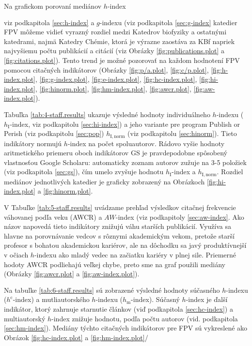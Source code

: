 Na grafickom porovaní mediánov $h$-index {viz podkapitola \ref{sec:h-index} a
$g$-indexu (viz podkapitola \ref{sec:g-index} katedier FPV môžeme vidieť vyrazný
rozdiel medzi Katedrov biofyziky a ostatnými katedrami, najmä Katedry Chémie,
ktorá je výrazne zaostáva za KBf napriek najvyšiemu počtu publikácií a citácií
(viz Obrázky \ref{fig:publications.plot} a \ref{fig:citations.plot}).  Tento
trend je možné pozorovať na každom hodnotení FPV pomocou citačných indikátorov
(Obrázky \ref{fig:p/a.plot}, \ref{fig:c/p.plot}, \ref{fig:h-index.plot},
\ref{fig:g-index.plot}, \ref{fig:e-index.plot}, \ref{fig:hc-index.plot}, \ref{fig:hi-index.plot},
\ref{fig:hinorm.plot}, \ref{fig:hm-index.plot}, \ref{fig:awcr.plot}, \ref{fig:aw-index.plot}).

Tabuľka \ref{tab:4-staff.results} ukazuje výsledné hodnoty individuálneho
$h$-indexu ($h_{\mathrm{I}}$-index, viz podkapitolu \ref{sec:hi-index}) a jeho
variante pre program Publish or Perish (viz podkapitolu \ref{sec:pop})
$h_{\mathrm{I,norm}}$ (viz podkapitolu \ref{sec:hinorm}). Tieto indikátory
normujú $h$-index na počet spoluautorov. Rádovo vyšie hodnoty aritmetického
priemeru oboch indikátorov GS je pravdepodobne spôsobený vlastnosťou Google Scholaru:
automaticky zoznam autorov zužuje na 3-5 položiek (viz podkapitola \ref{sec:gs}),
čím umelo zvyšuje hodnotu $h_{\mathrm{I}}$-index a $h_{\mathrm{I,norm}}$.
Rozdiel mediánov jednotlivých katedier je graficky zobrazený na Obrázkoch \ref{fig:hi-index.plot} a
\ref{fig:hinorm.plot}.

V Tabuľke \ref{tab:5-staff.results} uvádzame prehľad výsledkov citačnej frekvencie váhovanej
podľa veku (AWCR) a $AW$-index (viz podkapitoly \ref{sec:aw-index}. Ako názov napovedá
tieto indikátory znižujú váhu starších publikácií. Využíva sa hlavne na porovnávanie
vedcov s rôznymi akademickým vekom, pretože starší profesor s bohatou akademickou kariérov, ale
na dôchodku sa javý produktívnejší v očiach $h$-indexu ako mladý vedec na začiatku kariéry
v plnej sile. Priemerné hodoty AWCR podliehajú veľkej chybe, preto sme na graf použili
mediány (Obrázky \ref{fig:awcr.plot} a \ref{fig:aw-index.plot}).

Na tabuľke \ref{tab:6-staff.results} sú zobrazené výsledné hodnoty súčasného $h$-indexu
($h^{\mathrm{c}}$-index) a mutliautorského $h$-indexu ($h_{\mathrm{m}}$-index).
Súčasný $h$-index je ďalší indikátor, ktorý zahrnuje starnutie článkov (viď podkapitola \ref{sec:hc-index}) a
multiautorský $h$-index znižuje hodnotu, podľa počtu autorov (vid. podkapitola \ref{sec:hm-index}).
Mediány týchto citačných indikátorov pre FPV sú vykreslené ako Obrázok \ref{fig:hc-index.plot} a \ref{fig:hm-index.plot}/

}
